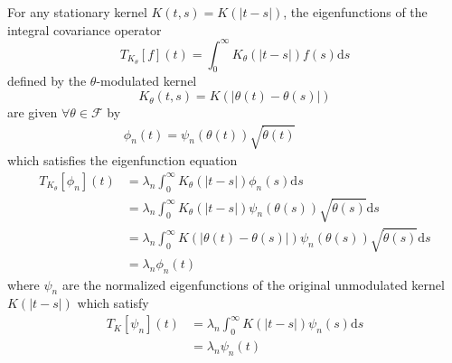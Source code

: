 \documentclass{mc}
\newcommand{\mathd}{\mathrm{d}}
\begin{document}
\begin{theorem}[Eigenfunctions]
  For any stationary kernel $K (t, s) = K (|t - s|)$, the eigenfunctions of
  the integral covariance operator
  \begin{equation}
    T_{K_{\theta}}  [f] (t) = \int_0^{\infty} K_{\theta} (| t - s |) f (s)
    \mathd s
  \end{equation}
  defined by the $\theta$-modulated kernel
  \begin{equation}
    K_{\theta} (t, s) = K (| \theta (t) - \theta (s) |)
  \end{equation}
  are given $\forall \theta \in \mathcal{F}$ by
  \begin{equation}
    \begin{array}{llllll}
      \phi_n (t) = \psi_n (\theta (t)) \sqrt{\dot{\theta} (t)} &  &  &  &  & 
    \end{array}
  \end{equation}
  which satisfies the eigenfunction equation
  \begin{equation}
    \begin{array}{ll}
      T_{K_{\theta}} [\phi_n] (t) & = \lambda_n \int_0^{\infty} K_{\theta} (|
      t - s |) \phi_n (s) \mathd s\\
      & = \lambda_n \int_0^{\infty} K_{\theta} (| t - s |) \psi_n (\theta
      (s)) \sqrt{\dot{\theta} (s)} \mathd s\\
      & = \lambda_n \int_0^{\infty} K (| \theta (t) - \theta (s) |) \psi_n
      (\theta (s)) \sqrt{\dot{\theta} (s)} \mathd s\\
      & = \lambda_n \phi_n (t)
    \end{array}
  \end{equation}
  where $\psi_n$ are the normalized eigenfunctions of the original unmodulated
  kernel $K (|t - s|)$ which satisfy
  \begin{equation}
    \begin{array}{ll}
      T_K [\psi_n] (t) & = \lambda_n \int_0^{\infty} K  (| t - s |) \psi_n (s)
      \mathd s\\
      & = \lambda_n \psi_n (t)
    \end{array}
  \end{equation}
\end{theorem}
\end{document}
